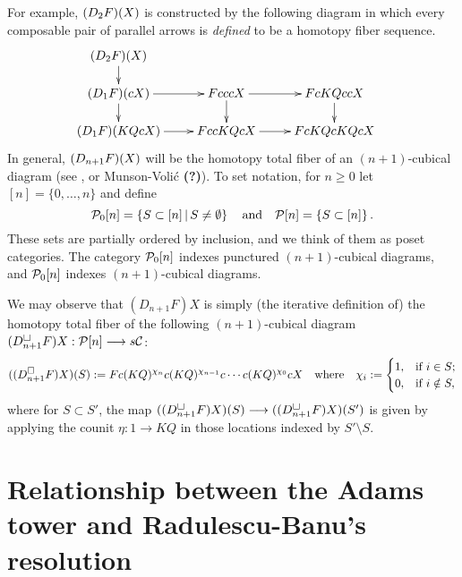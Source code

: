 \documentclass[11pt]{amsart}
\theoremstyle{plain}
\newcommand{\dupdown}[2]{D_{\smash{#1}}}
\begin{document}
For example, $(\dupdown{2}{c}F)(X)$ is constructed by the following diagram in which every composable pair of parallel arrows is \emph{defined} to be a homotopy fiber sequence.
\[\def\labelstyle{\scriptstyle}
\xymatrix@!0@R=30pt@C=43pt{
(\dupdown{2}{c}F)(X)\ar[d]\\
(\dupdown{1}{c}F)(cX) \ar[rr]\ar[d]         &           &FcccX \ar[rr]\ar[d]         &           &   FcKQccX            \ar[d]  &                  \\
(\dupdown{1}{c}F)(KQcX) \ar[rr] &                     &  FccKQcX \ar[rr] &             & FcKQcKQcX
}\]
In general, $(\dupdown{n+1}{c}F)(X)$ will be the homotopy total fiber of an $(n+1)$-cubical diagram (see \cite{GoodwillieCalcII}, \cite{LuisGoodwillie.pdf} or Munson-Voli\'c \textbf{(?)}). To set notation, for $n\geq0$ let $[n]=\{0,\ldots,n\}$ and define
\[\calP_0[n]
=
\left\{S\subset [n]\,\middle|\, S\neq\emptyset\right\}\quad \textup{and}\quad \calP[n]=\left\{S\subset [n]\right\}.\]
These sets are partially ordered by inclusion, and we think of them as poset categories. The category $\calP_0[n]$ indexes punctured $(n+1)$-cubical diagrams, and $\calP_0[n]$ indexes $(n+1)$-cubical diagrams.

We may observe that $(D_{n+1}F)X$ is simply (the iterative definition of) the homotopy total fiber of the following $(n+1)$-cubical diagram $({D}_{n+1}^{\smash{\square}}F)X:\calP[n]\to s\calC$:
\[(({D}_{n+1}^{\smash{\square}}F)X)(S):= Fc(KQ)^{\chi_{n}}c(KQ)^{\chi_{n-1}}c\cdots c(KQ)^{\chi_0}cX\quad \textup{where}\quad \chi_i:=\begin{cases}
1,&\textup{if }i\in S;\\
0,&\textup{if }i\notin S,
\end{cases}
\]
where for $S\subset S'$, the map $(({D}_{n+1}^{\smash{\square}}F)X)(S)\to (({D}_{n+1}^{\smash{\square}}F)X)(S')$ is given by applying the counit $\eta:1\to KQ$ in those locations indexed by $S'\setminus S$.

\section{Relationship between the Adams tower and Radulescu-Banu's resolution}\label{sec:relnWithRB}
\end{document}
